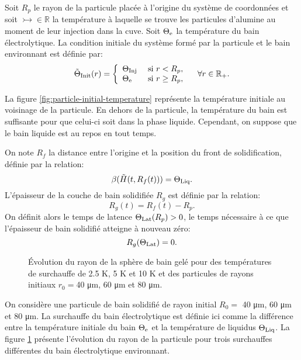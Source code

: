 Soit $R_p$ le rayon de la particule placée à l'origine du système de
coordonnées et soit $\tinj\in\mathbb R$ la température à laquelle se
trouve les particules d'alumine au moment de leur injection dans la
cuve. Soit $\Theta_\mathrm{e}$ la température du bain électrolytique. La
condition initiale du système formé par la particule et le bain
environnant est définie par:
\begin{equation}
  \tilde{\Theta}_\text{Init}(r) = \left\{
  \begin{array}{ll}
    \Theta_\text{Inj} & \text{ si } r < R_p,\\
    \Theta_\mathrm{e} & \text{ si } r \geq R_p,\\
  \end{array}
  \right.\quad \forall r\in \mathbb R_+ .\label{eq:initial-temperature}
\end{equation}

La figure \ref{fig:particle-initial-temperature} représente la
température initiale au voisinage de la particule. En dehors de la
particule, la température du bain est suffisante pour que celui-ci
soit dans la phase liquide. Cependant, on suppose que le bain liquide
est au repos en tout temps.

On note $R_f$ la distance entre l'origine et la position du front de
solidification, définie par la relation:
\begin{equation}
\beta(\tilde{H}(t, R_f(t))) = \Theta_\text{Liq}.
\end{equation}
L'épaisseur de la couche de bain solidifiée $R_g$ est définie par la
relation:
\begin{equation}
R_g(t) = R_f(t) - R_p.
\end{equation}
On définit alors le temps de latence $\Theta_\text{Lat}(R_p) > 0$, le temps
nécessaire à ce que l'épaisseur de bain solidifié atteigne à nouveau
zéro:
\begin{equation}
  R_g(\Theta_\text{Lat}) = 0.
\end{equation}

\begin{figure}
\begin{center}
  
  
  
  \caption{Évolution du rayon de la sphère de bain gelé pour des
    températures de surchauffe de \num{2.5} \si{\kelvin},
    \num{5} \si{\kelvin} et \num{10} \si{\kelvin} et des particules de
    rayons initiaux $r_0 = $\num{40} \si{\micro\meter},
    \num{60} \si{\micro\meter} et \num{80} \si{\micro\meter}.}
  \label{fig:freeze-radius}
\end{center}
\end{figure}
On considère une particule de bain solidifié de rayon initial $R_0 =$
\num{40} \si{\micro\meter}, \num{60} \si{\micro\meter} et
\num{80} \si{\micro\meter}. La surchauffe du bain électrolytique est
définie ici comme la différence entre la température initiale du bain
$\Theta_\mathrm{e}$ et la température de liquidus $\Theta_\text{Liq}$. La figure
\ref{fig:freeze-radius} présente l'évolution du rayon de la particule
pour trois surchauffes différentes du bain électrolytique environnant.

